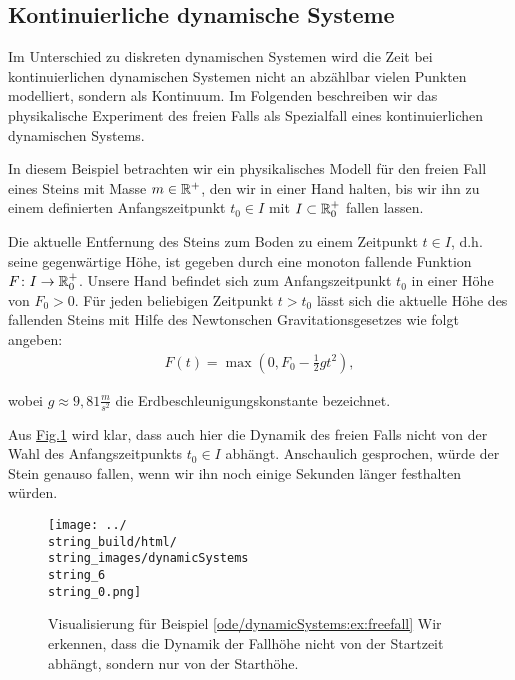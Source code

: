 \subsection{Kontinuierliche dynamische Systeme}
\label{\detokenize{ode/dynamicSystems:kontinuierliche-dynamische-systeme}}
\par
Im Unterschied zu diskreten dynamischen Systemen wird die Zeit bei kontinuierlichen dynamischen Systemen nicht an abzählbar vielen Punkten modelliert, sondern als Kontinuum.
Im Folgenden beschreiben wir das physikalische Experiment des freien Falls als Spezialfall eines kontinuierlichen dynamischen Systems.
\label{ode/dynamicSystems:ex:freefall}
\begin{example}{}{}



\par
In diesem Beispiel betrachten wir ein physikalisches Modell für den freien Fall eines Steins mit Masse \(m \in \mathbb{R}^+\), den wir in einer Hand halten, bis wir ihn zu einem definierten Anfangszeitpunkt \(t_0 \in I\) mit \(I \subset \mathbb{R}^+_0\) fallen lassen.

\par
Die aktuelle Entfernung des Steins zum Boden zu einem Zeitpunkt \(t \in I\), d.h. seine gegenwärtige Höhe, ist gegeben durch eine monoton fallende Funktion \(F \colon I \rightarrow \mathbb{R}^+_0\).
Unsere Hand befindet sich zum Anfangszeitpunkt \(t_0\) in einer Höhe von \(F_0 > 0\).
Für jeden beliebigen Zeitpunkt \(t > t_0\) lässt sich die aktuelle Höhe des fallenden Steins mit Hilfe des Newtonschen Gravitationsgesetzes wie folgt angeben:
\begin{align*}
F(t) = \max(0, F_0 - \frac{1}{2}gt^2),
\end{align*}
\par
wobei \(g \approx 9,81 \frac{m}{s^2}\) die Erdbeschleunigungskonstante bezeichnet.

\par
Aus \hyperref[\detokenize{ode/dynamicSystems:fig-free-fall}]{Fig.\@ \ref{\detokenize{ode/dynamicSystems:fig-free-fall}}} wird klar, dass auch hier die Dynamik des freien Falls nicht von der Wahl des Anfangszeitpunkts \(t_0 \in I\) abhängt.
Anschaulich gesprochen, würde der Stein genauso fallen, wenn wir ihn noch einige Sekunden länger festhalten würden.
\end{example}

\begin{figure}[htbp]
\centering


\noindent\texttt{[image: ../\\string\_build/html/\\string\_images/dynamicSystems\\string\_6\\string\_0.png]}
\caption{Visualisierung für Beispiel \cref{ode/dynamicSystems:ex:freefall}  Wir erkennen, dass die Dynamik der Fallhöhe nicht von der Startzeit abhängt, sondern nur von der Starthöhe.}\label{\detokenize{ode/dynamicSystems:fig-free-fall}}\end{figure}


